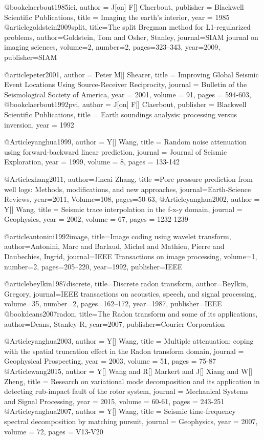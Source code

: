 @book{claerbout1985iei,
   author = {J[on] F[] Claerbout},
   publisher = {Blackwell Scientific Publications},
   title = {Imaging the earth's interior},
   year = {1985}
}
@article{goldstein2009split,
  title={The split Bregman method for L1-regularized problems},
  author={Goldstein, Tom and Osher, Stanley},
  journal={SIAM journal on imaging sciences},
  volume={2},
  number={2},
  pages={323--343},
  year={2009},
  publisher={SIAM}
}

@article{peter2001,
  author =	 {Peter M[] Shearer},
  title =	 {Improving Global Seismic Event Locations Using Source-Receiver Reciprocity},
  journal = 	 {Bulletin of the Seismological Society of America},
  year = 	 2001,
  volume =	 91,
  pages =	 {594-603},
}
@book{claerbout1992pvi,
   author = {J[on] F[] Claerbout},
   publisher = {Blackwell Scientific Publications},
   title = {Earth soundings analysis: processing versus inversion},
   year = {1992}
}

@Article{yanghua1999,
  author = 	 {Y[] Wang},
  title = 	 {Random noise attenuation using forward-backward linear prediction},
  journal = 	 {Journal of Seismic Exploration},
  year = 	 1999,
  volume =	 8,
  pages =	 {133-142}
}

@Article{zhang2011,
  author={Jincai Zhang},
  title ={Pore pressure prediction from well logs: Methods, modifications, and new approaches},
  journal={Earth-Science Reviews},
  year=2011,
  Volume=108,
  pages={50-63},
}
@Article{yanghua2002,
  author = 	 {Y[] Wang},
  title = 	 {Seismic trace interpolation in the f-x-y domain},
  journal = 	 {Geophysics},
  year = 	 2002,
  volume =	 67,
  pages =	 {1232-1239}
}

@article{antonini1992image,
  title={Image coding using wavelet transform},
  author={Antonini, Marc and Barlaud, Michel and Mathieu, Pierre and Daubechies, Ingrid},
  journal={IEEE Transactions on image processing},
  volume={1},
  number={2},
  pages={205--220},
  year={1992},
  publisher={IEEE}
}

@article{beylkin1987discrete,
  title={Discrete radon transform},
  author={Beylkin, Gregory},
  journal={IEEE transactions on acoustics, speech, and signal processing},
  volume={35},
  number={2},
  pages={162--172},
  year={1987},
  publisher={IEEE}
}
@book{deans2007radon,
  title={The Radon transform and some of its applications},
  author={Deans, Stanley R},
  year={2007},
  publisher={Courier Corporation}
}

@Article{yanghua2003,
  author = 	 {Y[] Wang},
  title = 	 {Multiple attenuation: coping with the spatial truncation effect in the Radon transform domain},
  journal = 	 {Geophysical Prospecting},
  year = 	 2003,
  volume =	 51,
  pages =	 {75-87}
}
@Article{wang2015,
  author = 	 {Y[] Wang and R[] Markert and J[] Xiang and W[] Zheng},
  title = 	 {Research on variational mode decomposition and its application in detecting rub-impact fault of the rotor system},
  journal = 	 {Mechanical Systems and Signal Processing},
  year = 	 2015,
  volume =	 60-61,
  pages =	 {243-251}
}
@Article{yanghua2007,
  author = 	 {Y[] Wang},
  title = 	 {Seismic time-frequency spectral decomposition by matching pursuit},
  journal = 	 {Geophysics},
  year = 	 2007,
  volume =	 72,
  pages =	 {V13-V20}
}

